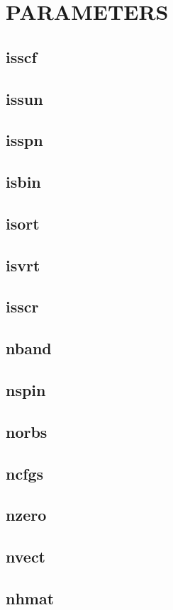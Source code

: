 \chapter{PARAMETERS}
\section{isscf}
\section{issun}
\section{isspn}
\section{isbin}
\section{isort}
\section{isvrt}
\section{isscr}
\section{nband}
\section{nspin}
\section{norbs}
\section{ncfgs}
\section{nzero}
\section{nvect}
\section{nhmat}
